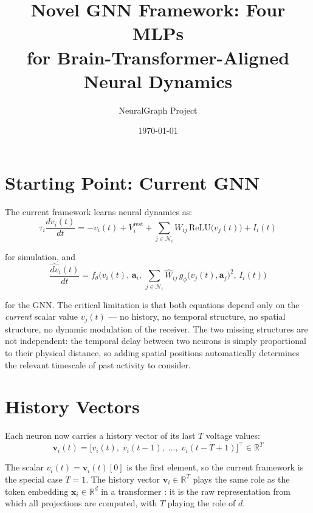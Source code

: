 \documentclass[11pt]{article}
\title{\textbf{Novel GNN Framework: Four MLPs\\for Brain-Transformer-Aligned Neural Dynamics}}
\author{NeuralGraph Project}
\date{\today}
\begin{document}
\maketitle

\section{Starting Point: Current GNN}

The current framework learns neural dynamics as:
\begin{equation}
\tau_i\frac{dv_i(t)}{dt} = -v_i(t) + V_i^{\text{rest}}
+ \sum_{j\in\mathcal{N}_i} W_{ij}\,
  \mathrm{ReLU}\!\big(v_j(t)\big)
+ I_i(t)
\label{eq:sim_current}
\end{equation}

for simulation, and
\begin{equation}
\frac{\widehat{dv}_i(t)}{dt}
= f_\theta\!\Big(
v_i(t),\,\mathbf{a}_i,\,
\sum_{j\in\mathcal{N}_i} \hat{W}_{ij}\,
g_\phi\!\big(v_j(t),\mathbf{a}_j\big)^2,\,
I_i(t)\Big)
\label{eq:gnn_current}
\end{equation}

for the GNN. The critical limitation is that both equations depend only on the
\emph{current} scalar value $v_j(t)$ --- no history, no temporal structure, no spatial structure,
no dynamic modulation of the receiver.
The two missing structures are not independent: the temporal delay between
two neurons is simply proportional to their physical distance, so adding
spatial positions automatically determines the relevant timescale of past
activity to consider.

\section{History Vectors}

Each neuron now carries a history vector of its last $T$ voltage values:
\begin{equation}
\mathbf{v}_i(t) = \bigl[v_i(t),\; v_i(t-1),\; \ldots,\; v_i(t-T+1)\bigr]^\top
\in \mathbb{R}^T
\end{equation}

The scalar $v_i(t) = \mathbf{v}_i(t)[0]$ is the first element, so
the current framework is the special case $T=1$. The history vector
$\mathbf{v}_i \in \mathbb{R}^T$ plays the same role as the token embedding
$\mathbf{x}_i \in \mathbb{R}^d$ in a transformer \citep{vaswani2017}: it is
the raw representation from which all projections are computed, with $T$
playing the role of $d$.
\end{document}
